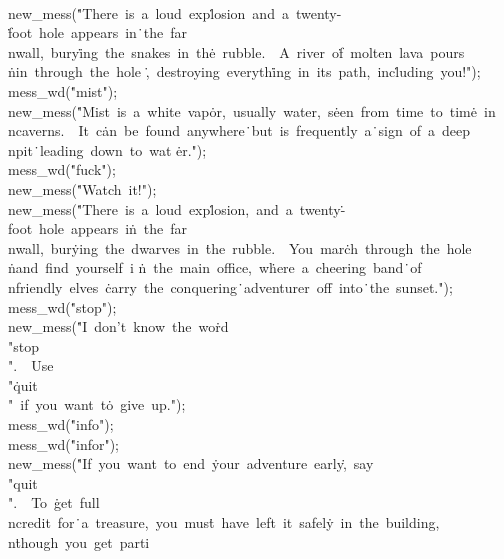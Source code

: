 \\{new\_mess}(\.{"There\ is\ a\ loud\ exp}\)\.{losion\ and\ a\ twenty-}\)\.{foot\ hole\ appears\ in}\)\.{\ the\ far\\nwall,\ bury}\)\.{ing\ the\ snakes\ in\ th}\)\.{e\ rubble.\ \ A\ river\ o}\)\.{f\ molten\ lava\ pours\\}\)\.{nin\ through\ the\ hole}\)%
\.{,\ destroying\ everyth}\)\.{ing\ in\ its\ path,\ inc}\)\.{luding\ you!"});\6
\\{mess\_wd}(\.{"mist"});\6
\\{new\_mess}(\.{"Mist\ is\ a\ white\ vap}\)\.{or,\ usually\ water,\ s}\)\.{een\ from\ time\ to\ tim}\)\.{e\ in\\ncaverns.\ \ It\ c}\)\.{an\ be\ found\ anywhere}\)\.{\ but\ is\ frequently\ a}\)\.{\ sign\ of\ a\ deep\\npit}\)\.{\ leading\ down\ to\ wat}\)%
\.{er."});\6
\\{mess\_wd}(\.{"fuck"});\6
\\{new\_mess}(\.{"Watch\ it!"});\6
\\{new\_mess}(\.{"There\ is\ a\ loud\ exp}\)\.{losion,\ and\ a\ twenty}\)\.{-foot\ hole\ appears\ i}\)\.{n\ the\ far\\nwall,\ bur}\)\.{ying\ the\ dwarves\ in\ }\)\.{the\ rubble.\ \ You\ mar}\)\.{ch\ through\ the\ hole\\}\)\.{nand\ find\ yourself\ i}\)%
\.{n\ the\ main\ office,\ w}\)\.{here\ a\ cheering\ band}\)\.{\ of\\nfriendly\ elves\ }\)\.{carry\ the\ conquering}\)\.{\ adventurer\ off\ into}\)\.{\ the\ sunset."});\6
\\{mess\_wd}(\.{"stop"});\6
\\{new\_mess}(\.{"I\ don't\ know\ the\ wo}\)\.{rd\ \\"stop\\".\ \ Use\ \\"}\)\.{quit\\"\ if\ you\ want\ t}\)\.{o\ give\ up."});\6
\\{mess\_wd}(\.{"info"});\6
\\{mess\_wd}(\.{"infor"});\6
\\{new\_mess}(\.{"If\ you\ want\ to\ end\ }\)\.{your\ adventure\ early}\)\.{,\ say\ \\"quit\\".\ \ To\ }\)\.{get\ full\\ncredit\ for}\)\.{\ a\ treasure,\ you\ mus}\)\.{t\ have\ left\ it\ safel}\)\.{y\ in\ the\ building,\\n}\)\.{though\ you\ get\ parti}\)%
